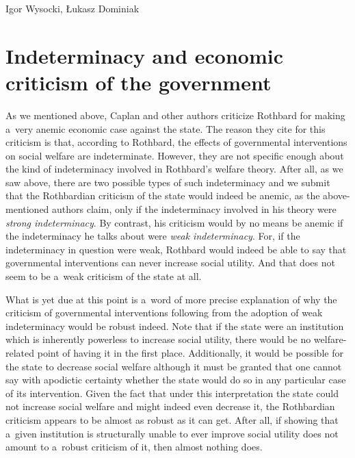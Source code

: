 \begin{artengenv}{Igor Wysocki, Łukasz Dominiak}
\section{Indeterminacy and economic criticism of the government}

As we mentioned above, Caplan and other authors criticize Rothbard for making a~very anemic economic case against the state. The reason they cite for this criticism is that, according to Rothbard, the effects of governmental interventions on social welfare are indeterminate. However, they are not specific enough about the kind of indeterminacy involved in Rothbard's welfare theory. After all, as we saw above, there are two possible types of such indeterminacy and we submit that the Rothbardian criticism of the state would indeed be anemic, as the above-mentioned authors claim, only if the indeterminacy involved in his theory were \textit{strong indeterminacy}. By contrast, his criticism would by no means be anemic if the indeterminacy he talks about were \textit{weak indeterminacy}. For, if the indeterminacy in question were weak, Rothbard would indeed be able to say that governmental interventions can never increase social utility. And that does not seem to be a~weak criticism of the state at all.



What is yet due at this point is a~word of more precise explanation of why the criticism of governmental interventions following from the adoption of weak indeterminacy would be robust indeed. Note that if the state were an institution which is inherently powerless to increase social utility, there would be no welfare-related point of having it in the first place. Additionally, it would be possible for the state to decrease social welfare although it must be granted that one cannot say with apodictic certainty whether the state would do so in any particular case of its intervention. Given the fact that under this interpretation the state could not increase social welfare and might indeed even decrease it, the Rothbardian criticism appears to be almost as robust as it can get. After all, if showing that a~given institution is structurally unable to ever improve social utility does not amount to a~robust criticism of it, then almost nothing does.




\end{artengenv}
